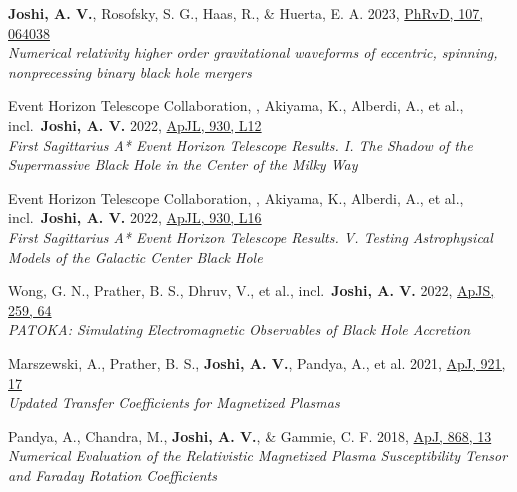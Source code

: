 \item \textbf{Joshi, A. V.}, Rosofsky, S. G., Haas, R., \& Huerta, E. A. 2023, \href{https://ui.adsabs.harvard.edu/abs/2023PhRvD.107f4038J}{PhRvD, 107, 064038}\\\textit{Numerical relativity higher order gravitational waveforms of eccentric, spinning, nonprecessing binary black hole mergers}

\item Event Horizon Telescope Collaboration, , Akiyama, K., Alberdi, A., et al., incl.\ \textbf{Joshi, A. V.} 2022, \href{https://ui.adsabs.harvard.edu/abs/2022ApJ...930L..12E}{ApJL, 930, L12}\\\textit{First Sagittarius A* Event Horizon Telescope Results. I. The Shadow of the Supermassive Black Hole in the Center of the Milky Way}

\item Event Horizon Telescope Collaboration, , Akiyama, K., Alberdi, A., et al., incl.\ \textbf{Joshi, A. V.} 2022, \href{https://ui.adsabs.harvard.edu/abs/2022ApJ...930L..16E}{ApJL, 930, L16}\\\textit{First Sagittarius A* Event Horizon Telescope Results. V. Testing Astrophysical Models of the Galactic Center Black Hole}

\item Wong, G. N., Prather, B. S., Dhruv, V., et al., incl.\ \textbf{Joshi, A. V.} 2022, \href{https://ui.adsabs.harvard.edu/abs/2022ApJS..259...64W}{ApJS, 259, 64}\\\textit{PATOKA\@: Simulating Electromagnetic Observables of Black Hole Accretion}

\item Marszewski, A., Prather, B. S., \textbf{Joshi, A. V.}, Pandya, A., et al. 2021, \href{https://ui.adsabs.harvard.edu/abs/2021ApJ...921...17M}{ApJ, 921, 17}\\\textit{Updated Transfer Coefficients for Magnetized Plasmas}

\item Pandya, A., Chandra, M., \textbf{Joshi, A. V.}, \& Gammie, C. F. 2018, \href{https://ui.adsabs.harvard.edu/abs/2018ApJ...868...13P}{ApJ, 868, 13}\\\textit{Numerical Evaluation of the Relativistic Magnetized Plasma Susceptibility Tensor and Faraday Rotation Coefficients}

